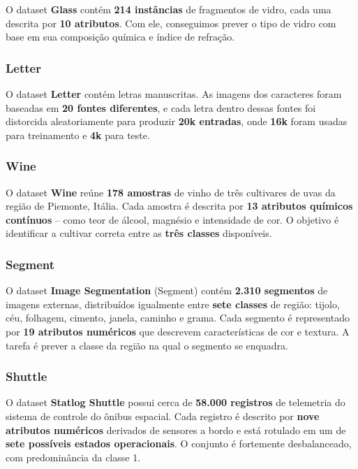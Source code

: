 \documentclass{article}
\begin{document}
O dataset \textbf{Glass} contém \textbf{214 instâncias} de fragmentos de vidro, cada uma descrita por \textbf{10 atributos}. Com ele, conseguimos prever o tipo de vidro com base em sua composição química e índice de refração.

\subsubsection{Letter}

O dataset \textbf{Letter} contém letras manuscritas. As imagens dos caracteres foram baseadas em \textbf{20 fontes diferentes}, e cada letra dentro dessas fontes foi distorcida aleatoriamente para produzir \textbf{20k entradas}, onde \textbf{16k} foram usadas para treinamento e \textbf{4k} para teste.

\subsubsection{Wine}

O dataset \textbf{Wine} reúne \textbf{178 amostras} de vinho de três cultivares de uvas da região de Piemonte, Itália. Cada amostra é descrita por \textbf{13 atributos químicos contínuos} – como teor de álcool, magnésio e intensidade de cor. O objetivo é identificar a cultivar correta entre as \textbf{três classes} disponíveis.

\subsubsection{Segment}

O dataset \textbf{Image Segmentation} (Segment) contém \textbf{2.310 segmentos} de imagens externas, distribuídos igualmente entre \textbf{sete classes} de região: tijolo, céu, folhagem, cimento, janela, caminho e grama. Cada segmento é representado por \textbf{19 atributos numéricos} que descrevem características de cor e textura. A tarefa é prever a classe da região na qual o segmento se enquadra.

\subsubsection{Shuttle}

O dataset \textbf{Statlog Shuttle} possui cerca de \textbf{58.000 registros} de telemetria do sistema de controle do ônibus espacial. Cada registro é descrito por \textbf{nove atributos numéricos} derivados de sensores a bordo e está rotulado em um de \textbf{sete possíveis estados operacionais}. O conjunto é fortemente desbalanceado, com predominância da classe 1.
\end{document}
